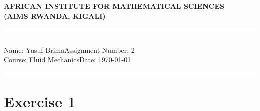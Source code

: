 \documentclass[12pt,a4paper]{article}
\newcommand{\student}{Yusuf Brima}
\newcommand{\course}{Fluid Mechanics}
\newcommand{\assignment}{2}
\begin{document}
\thispagestyle{empty}
\begin{center}
\textbf{AFRICAN INSTITUTE FOR MATHEMATICAL SCIENCES \\[0.5cm]
(AIMS RWANDA, KIGALI)}
\vspace{1.0cm}
\end{center}

\noindent
\rule{17cm}{0.2cm}\\[0.3cm]
Name: \student \hfill Assignment Number: \assignment\\[0.1cm]
Course: \course \hfill Date: \today\\
\rule{17cm}{0.05cm}
\vspace{1.0cm}
\section*{Exercise 1}
\end{document}
